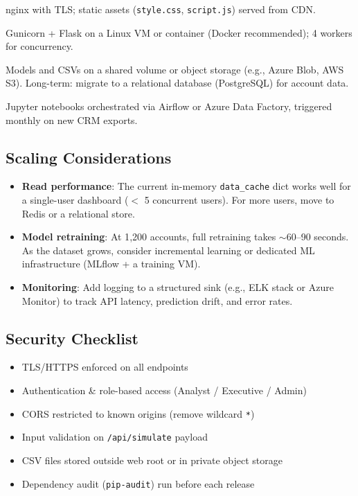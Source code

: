 \documentclass[11pt,a4paper]{article}
\begin{document}
\begin{description}[leftmargin=1.5cm]
  \item[Tier 1 — CDN / Load Balancer] nginx with TLS; static assets
    (\texttt{style.css}, \texttt{script.js}) served from CDN.
  \item[Tier 2 — Application Server] Gunicorn + Flask on a Linux VM or
    container (Docker recommended); 4 workers for concurrency.
  \item[Tier 3 — Data / Model Store] Models and CSVs on a shared volume
    or object storage (e.g., Azure Blob, AWS S3). Long-term: migrate to a
    relational database (PostgreSQL) for account data.
  \item[Tier 4 — Batch Pipeline] Jupyter notebooks orchestrated via
    Airflow or Azure Data Factory, triggered monthly on new CRM exports.
\end{description}

\subsection{Scaling Considerations}

\begin{itemize}[leftmargin=1.5cm, noitemsep]
  \item \textbf{Read performance}: The current in-memory \texttt{data\_cache}
    dict works well for a single-user dashboard ($<$ 5 concurrent users). For
    more users, move to Redis or a relational store.
  \item \textbf{Model retraining}: At 1{,}200 accounts, full retraining takes
    $\sim$60--90 seconds. As the dataset grows, consider incremental learning or
    dedicated ML infrastructure (MLflow + a training VM).
  \item \textbf{Monitoring}: Add logging to a structured sink (e.g., ELK stack
    or Azure Monitor) to track API latency, prediction drift, and error rates.
\end{itemize}

\subsection{Security Checklist}

\begin{itemize}[leftmargin=1.5cm, noitemsep]
  \item[$\square$] TLS/HTTPS enforced on all endpoints
  \item[$\square$] Authentication \& role-based access (Analyst / Executive / Admin)
  \item[$\square$] CORS restricted to known origins (remove wildcard \texttt{*})
  \item[$\square$] Input validation on \texttt{/api/simulate} payload
  \item[$\square$] CSV files stored outside web root or in private object storage
  \item[$\square$] Dependency audit (\texttt{pip-audit}) run before each release
\end{itemize}
\end{document}
